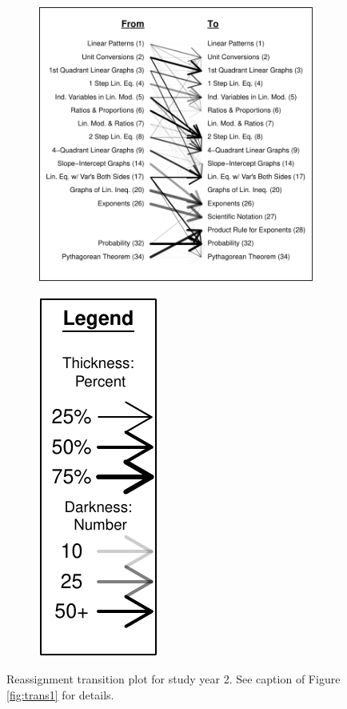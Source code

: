 \documentclass[notitlepage,12pt]{jedm}\usepackage[]{graphicx}\usepackage[]{color}
\makeatletter
\def\maxwidth{ %
  \ifdim\Gin@nat@width>\linewidth
    \linewidth
  \else
    \Gin@nat@width
  \fi
}
\makeatother
\begin{document}
\begin{figure}
  \centering
  \begin{subfigure}{5in}

\includegraphics[width=\maxwidth]{figure/transition2-1} 

\end{subfigure}
\begin{subfigure}{1in}

\includegraphics[width=\maxwidth]{figure/trans2legend-1} 

\end{subfigure}
\caption{Reassignment transition plot for study year 2. See caption of
Figure \ref{fig:trans1} for details.}
\label{fig:trans2}
\end{figure}
\end{document}
